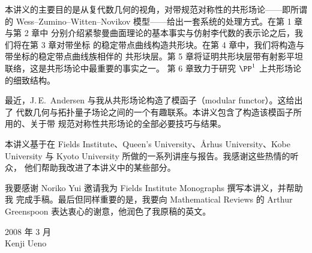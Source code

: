 
\begin{sloppypar}本讲义的主要目的是从复代数几何的视角，对带规范对称性的共形场论——即所谓的
Wess--Zumino--Witten--Novikov 模型——给出一套系统的处理方式。在第 1 章与第 2 章中
分别介绍紧黎曼曲面理论的基本事实与仿射李代数的表示论之后，我们将在第 3 章对带坐标
的稳定带点曲线构造共形块。在第 4 章中，我们将构造与带坐标的稳定带点曲线族相伴的
共形块层。第 5 章将证明共形块层带有射影平坦联络，这是共形场论中最重要的事实之一。
第 6 章致力于研究 $\PP^1$ 上共形场论的细致结构。
\end{sloppypar}


最近，J.\,E.\ Andersen 与我从共形场论构造了模函子（modular functor）。这给出了
代数几何与拓扑量子场论之间的一个有趣联系。本讲义包含了构造该模函子所用的、关于带
规范对称性共形场论的全部必要技巧与结果。


本讲义基于在 Fields Institute、Queen's University、Århus University、Kobe
University 与 Kyoto University 所做的一系列讲座与报告。我感谢这些热情的听众，
他们帮助我改进了本讲义中的某些部分。

我要感谢 Noriko Yui 邀请我为 Fields Institute Monographs 撰写本讲义，并帮助我
完成手稿。最后但同样重要的是，我要向 Mathematical Reviews 的 Arthur Greenspoon
表达衷心的谢意，他润色了我原稿的英文。

\vspace{1.2em}
\begin{flushright}
2008 年 3 月\\
Kenji Ueno
\end{flushright}
